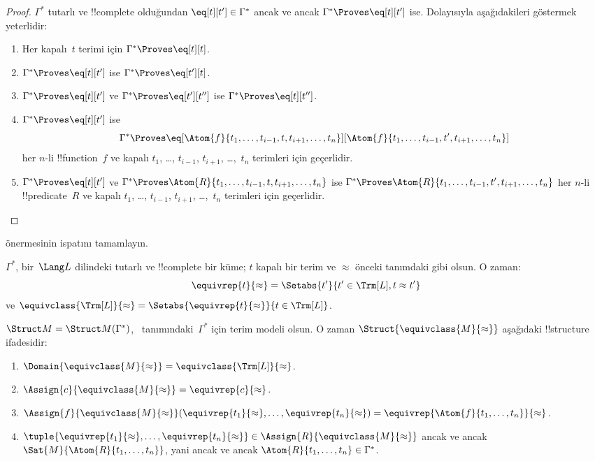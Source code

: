 \documentclass[../../../include/open-logic-section]{subfiles}
\begin{document}
\begin{proof}
$\Gamma^*$ tutarlı ve !!{complete} olduğundan $\eq[t][t']\in\Gamma^*$
ancak ve ancak $\Gamma^*\Proves\eq[t][t']$ ise. Dolayısıyla
aşağıdakileri göstermek yeterlidir:
\begin{enumerate}
\item Her kapalı~$t$ terimi için $\Gamma^*\Proves\eq[t][t]$.
\item $\Gamma^*\Proves\eq[t][t']$ ise $\Gamma^*\Proves\eq[t'][t]$.
\item $\Gamma^*\Proves\eq[t][t']$ ve $\Gamma^*\Proves\eq[t'][t'']$
  ise $\Gamma^*\Proves\eq[t][t'']$.
\item $\Gamma^*\Proves\eq[t][t']$ ise
\[
\Gamma^* \Proves
\eq[\Atom{f}{t_1,\dots,t_{i-1},t,t_{i+1},\dots,t_n}][\Atom{f}{t_1,\dots,t_{i-1},t',t_{i+1},\dots,t_n}]
\]
her $n$-li !!{function}~$f$ ve kapalı $t_1$, \dots, $t_{i-1}$,
$t_{i+1}$, \dots,~$t_n$ terimleri için geçerlidir.
\item $\Gamma^*\Proves\eq[t][t']$ ve
$\Gamma^*\Proves\Atom{R}{t_1,\dots,t_{i-1},t,t_{i+1},\dots,t_n}$ ise
$\Gamma^*\Proves\Atom{R}{t_1,\dots,t_{i-1},t',t_{i+1},\dots,t_n}$
her $n$-li !!{predicate}~$R$ ve kapalı $t_1$, \dots, $t_{i-1}$,
$t_{i+1}$, \dots,~$t_n$ terimleri için geçerlidir.
\end{enumerate}
\end{proof}

\begin{prob}
 önermesinin ispatını tamamlayın.
\end{prob}

\begin{defn}
$\Gamma^*$, bir~$\Lang L$ dilindeki tutarlı ve !!{complete} bir küme;
$t$ kapalı bir terim ve $\approx$ önceki tanımdaki gibi olsun. O zaman:
\[
\equivrep{t}{\approx} = \Setabs{t'}{t'\in \Trm[L], t \approx t'}
\]
ve
$\equivclass{\Trm[L]}{\approx}=\Setabs{\equivrep{t}{\approx}}{t\in\Trm[L]}$.
\end{defn}

\begin{defn}
$\Struct M=\Struct M(\Gamma^*)$,~
tanımındaki~$\Gamma^*$ için terim modeli olsun. O zaman
$\Struct{\equivclass{M}{\approx}}$ aşağıdaki !!{structure} ifadesidir:
\begin{enumerate}
\item $\Domain{\equivclass{M}{\approx}}=\equivclass{\Trm[L]}{\approx}$.
\item $\Assign{c}{\equivclass{M}{\approx}}=\equivrep{c}{\approx}$.
\item $\Assign{f}{\equivclass{M}{\approx}}(\equivrep{t_1}{\approx},\dots,
  \equivrep{t_n}{\approx})=\equivrep{\Atom{f}{t_1,\dots,t_n}}{\approx}$.
\item $\tuple{\equivrep{t_1}{\approx},\dots,\equivrep{t_n}{\approx}}
  \in\Assign{R}{\equivclass{M}{\approx}}$ ancak ve ancak
  $\Sat{M}{\Atom{R}{t_1,\dots,t_n}}$, yani ancak ve ancak
  $\Atom{R}{t_1,\dots,t_n}\in\Gamma^*$.
\end{enumerate}
\end{defn}
\end{document}
